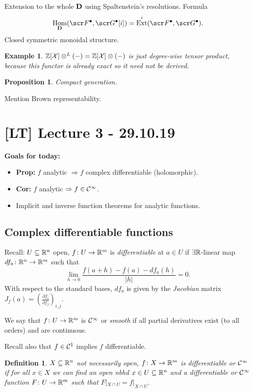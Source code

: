 \documentclass[A4paper, british]{amsart}
\theoremstyle{darkgreentheorem}
\newtheorem{prop}[thm]{Proposition}
\theoremstyle{darkbluedefinition}
\newtheorem{defn}[thm]{Definition}
\theoremstyle{darkredexample}
\newtheorem{exa}[thm]{Example}
\theoremstyle{remark}
\DeclareMathOperator{\Hom}{Hom}
\DeclareMathOperator{\Ext}{Ext}
\newcommand{\1}{\mathbbm{1}}
\newcommand{\ot}{\otimes}
\newcommand{\grd}{^{\bullet}}
\begin{document}
Extension to the whole $\mathbf{D}$ using Spaltenstein's resolutions.
Formula
\[ \Hom_{\D}(\F\grd,\G\grd[i])=\Ext^{i}(\F\grd,\G\grd).\]
Closed symmetric monoidal structure.

\begin{exa}
    $\Z[\X]\ot^{L}(-)=\Z[\X]\ot(-)$ is just degree-wise tensor product, because this functor is already exact so it need not be derived.
\end{exa}

\begin{prop}
    Compact generation.
\end{prop}

Mention Brown representability.

\section{[LT] Lecture 3 - 29.10.19}

\textbf{Goals for today:}
\begin{itemize}
    \item \textbf{Prop:} $f$ analytic $\Rightarrow f$ complex differentiable (holomorphic).
    \item \textbf{Cor:} $f$ analytic $\Rightarrow f\in \mathcal{C}^{\infty}$.
    \item Implicit and inverse function theorems for analytic functions.
\end{itemize}

\subsection{Complex differentiable functions}

Recall: $U\subseteq \mathbb{R}^{n}$ open, $f\colon U\to \mathbb{R}^{m}$ is \textit{differentiable} at $a\in U$ if $\exists \mathbb{R}$-linear map $df_{a}\colon \mathbb{R}^{n}\to \mathbb{R}^{m}$ such that
\[ \lim_{h\to 0}\frac{f(a+h)-f(a)-df_{a}(h)}{|h|}=0.\]
With respect to the standard bases, $df_{a}$ is given by the \textit{Jacobian} matrix $J_{f}(a)=(\frac{\partial f_{i}}{\partial f_{j}})_{i,j}$.

We say that $f\colon U\to \mathbb{R}^{m}$ is $\mathcal{C}^{\infty}$ or \textit{smooth} if all partial derivatives exist (to all orders) and are continuous.

Recall also that $f\in \mathcal{C}^{1}$ implies $f$ differentiable.

\begin{defn}
    $X\subseteq \mathbb{R}^{n}$ not necessarily open, $f\colon X\to \mathbb{R}^{m}$ is \textit{differentiable} or $\mathcal{C}^{\infty}$ if for all $x\in X$ we can find an open nbhd $x\in U\subseteq \mathbb{R}^{n}$ and a differentiable or $\mathcal{C}^{\infty}$ function $F\colon U\to \mathbb{R}^{m}$ such that $F|_{X\cap U}=f|_{X\cap U}$.
\end{defn}
\end{document}

